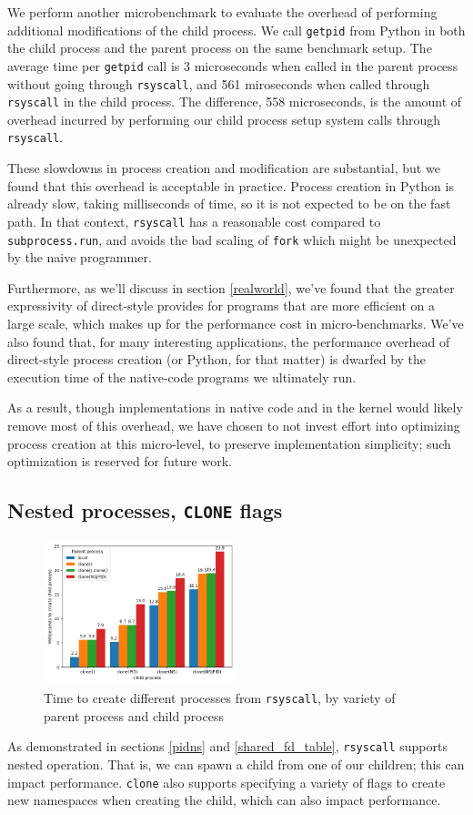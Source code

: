 \documentclass[letterpaper,twocolumn,10pt]{article}
\begin{document}
We perform another microbenchmark to evaluate the overhead of performing additional modifications of the child process.
We call \texttt{getpid} from Python
in both the child process and the parent process on the same benchmark setup.
The average time per \texttt{getpid} call is
3 microseconds when called in the parent process without going through \texttt{rsyscall},
and 561 miroseconds when called through \texttt{rsyscall} in the child process.
The difference, 558 microseconds,
is the amount of overhead incurred
by performing our child process setup system calls through \texttt{rsyscall}.

These slowdowns in process creation and modification are substantial,
but we found that this overhead is acceptable in practice.
Process creation in Python is already slow, taking milliseconds of time,
so it is not expected to be on the fast path.
In that context, \texttt{rsyscall} has a reasonable cost compared to \texttt{subprocess.run},
and avoids the bad scaling of \texttt{fork} which might be unexpected by the naive programmer.

Furthermore, as we'll discuss in section \ref{realworld},
we've found that the greater expressivity of direct-style
provides for programs that are more efficient on a large scale,
which makes up for the performance cost in micro-benchmarks.
We've also found that, for many interesting applications,
the performance overhead of direct-style process creation (or Python, for that matter)
is dwarfed by the execution time of the native-code programs we ultimately run.

As a result, though implementations in native code and in the kernel would likely remove most of this overhead,
we have chosen to not invest effort into optimizing process creation at this micro-level,
to preserve implementation simplicity;
such optimization is reserved for future work.
\subsection{Nested processes, \texttt{CLONE} flags}\label{clone_bench}
\begin{figure}
\centering
 \includegraphics[width=0.5\textwidth]{clone_bench}
 \caption{Time to create different processes from \texttt{rsyscall}, by variety of parent process and child process}
 \label{fig:clone_bench}
\end{figure}
As demonstrated in sections \ref{pidns} and \ref{shared_fd_table},
\texttt{rsyscall} supports nested operation.
That is, we can spawn a child from one of our children;
this can impact performance.
\texttt{clone} also supports specifying a variety of flags to create new namespaces when creating the child,
which can also impact performance.
\end{document}
